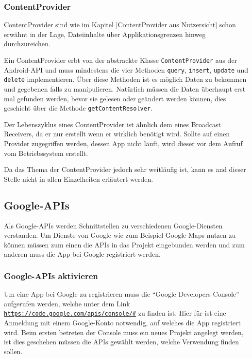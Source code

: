 \subsubsection{ContentProvider}
ContentProvider sind wie im Kapitel \ref{ContentProvider aus Nutzersicht} schon erw\"ahnt in der Lage, Dateiinhalte \"uber Applikationsgrenzen hinweg durchzureichen.

Ein ContentProvider erbt von der abstrackte Klasse \texttt{ContentProvider} aus der Android-API und muss mindestens die vier Methoden \texttt{query}, \texttt{insert}, \texttt{update} und \texttt{delete} implementieren. \"Uber diese Methoden ist es m\"oglich Daten zu bekommen und gegebenen falls zu manipulieren. Nat\"urlich m\"ussen die Daten \"uberhaupt erst mal gefunden werden, bevor sie gelesen oder ge\"andert werden k\"onnen, dies geschieht \"uber die Methode \texttt{getContentResolver}. \cite{Kuehn12}

Der Lebenszyklus eines ContentProvider ist \"ahnlich dem eines Broadcast Receivers, da er nur erstellt wenn er wirklich ben\"otigt wird. Sollte auf einen Provider zugegriffen werden, dessen App nicht l\"auft, wird dieser vor dem Aufruf vom Betriebssystem erstellt.

Da das Thema der ContentProvider jedoch sehr weitl\"aufig ist, kann es and dieser Stelle nicht in allen Einzelheiten erl\"autert werden. 

\subsection{Google-APIs} \label{Google-APIs}
Als Google-APIs werden Schnittstellen zu verschiedenen Google-Diensten verstanden. Um Dienste von Google wie zum Beispiel Google Maps nutzen zu k\"onnen m\"ussen zum einen die APIs in das Projekt eingebunden werden und zum anderen muss die App bei Google registriert werden.


\subsubsection{Google-APIs aktivieren}
Um eine App bei Google zu registrieren muss die "`Google Developers Console"' aufgerufen werden, welche unter dem Link \texttt{\url{https://code.google.com/apis/console/\#}} zu finden ist. Hier f\"ur ist eine Anmeldung mit einem Google-Konto notwendig, auf welches die App registriert wird. Beim ersten betreten der Console muss ein neues Projekt angelegt werden, ist dies geschehen m\"ussen die APIs gew\"ahlt werden, welche Verwendung finden sollen.

